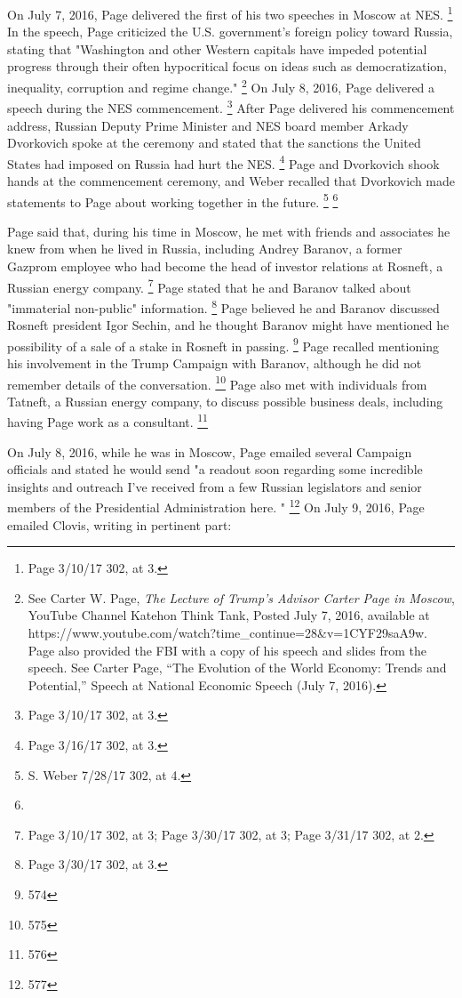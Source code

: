 On July 7, 2016, Page delivered the first of his two speeches in Moscow at NES. %
\footnote{Page 3/10/17 302, at 3.}
In the speech, Page criticized the U.S. government's foreign policy toward Russia, stating that "Washington and other Western capitals have impeded potential progress through their often hypocritical focus on ideas such as democratization, inequality, corruption and regime change."%
\footnote{See Carter W. Page, \textit{The Lecture of Trump’s Advisor Carter Page in Moscow}, YouTube Channel Katehon Think Tank, Posted July 7, 2016, 
available at https://www.youtube.com/watch?time_continue=28&v=1CYF29saA9w. 
Page also provided the FBI with a copy of his speech and slides from the speech. 
See Carter Page, “The Evolution of the World Economy: Trends and Potential,” Speech at National Economic Speech (July 7, 2016).}
On July 8, 2016, Page delivered a speech during the NES commencement.%
\footnote{Page 3/10/17 302, at 3.}
After Page delivered his commencement address, Russian Deputy Prime Minister and NES board member Arkady Dvorkovich spoke at the ceremony and stated that the sanctions the United States had imposed on Russia had hurt the NES.%
\footnote{Page 3/16/17 302, at 3.}
Page and Dvorkovich shook hands at the commencement ceremony, and Weber recalled that Dvorkovich made statements to Page about working together in the future.%
\footnote{S. Weber 7/28/17 302, at 4.}
\footnote{}

Page said that, during his time in Moscow, he met with friends and associates he knew from when he lived in Russia, including Andrey Baranov, a former Gazprom employee who had become the head of investor relations at Rosneft, a Russian energy company.%
\footnote{Page 3/10/17 302, at 3; 
Page 3/30/17 302, at 3; 
Page 3/31/17 302, at 2.}
Page stated that he and Baranov talked about "immaterial non-public" information.%
\footnote{Page 3/30/17 302, at 3.}
Page believed he and Baranov discussed Rosneft president Igor Sechin, and he thought Baranov might have mentioned he possibility of a sale of a stake in Rosneft in passing.%
\footnote{574}
Page recalled mentioning his involvement in the Trump Campaign with Baranov, although he did not remember details of the conversation.%
\footnote{575}
Page also met with individuals from Tatneft, a Russian energy company, to discuss possible business deals, including having Page work as a consultant.%
\footnote{576}

On July 8, 2016, while he was in Moscow, Page emailed several Campaign officials and stated he would send "a readout soon regarding some incredible insights and outreach I've received from a few Russian legislators and senior members of the Presidential Administration here. "%
\footnote{577}
On July 9, 2016, Page emailed Clovis, writing in pertinent part:

